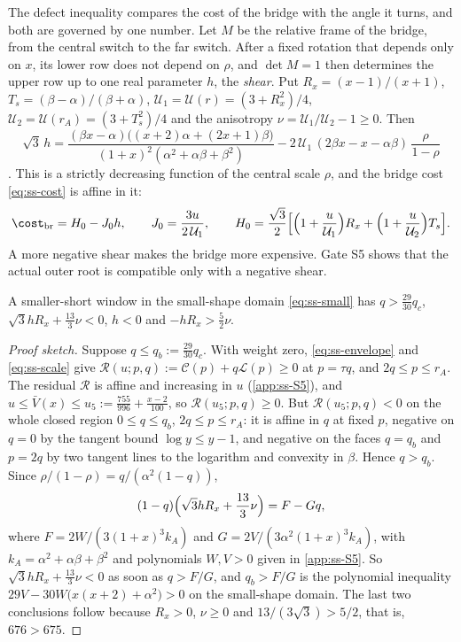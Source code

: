 The defect inequality compares the cost of the bridge with the angle it turns, and both are
governed by one number. Let $M$ be the relative frame of the bridge, from the central switch to
the far switch. After a fixed rotation that depends only on $x$, its lower row does not depend on
$\rho$, and $\det M=1$ then determines the upper row up to one real parameter $h$, the
\emph{shear}. Put $R_x=(x-1)/(x+1)$, $T_s=(\beta-\alpha)/(\beta+\alpha)$,
$\mathcal U_1=\mathcal U(r)=(3+R_x^2)/4$, $\mathcal U_2=\mathcal U(r_A)=(3+T_s^2)/4$ and the
anisotropy $\nu=\mathcal U_1/\mathcal U_2-1\ge0$. Then
\begin{equation}\label{eq:ss-shear}
  \sqrt3\,h=\frac{(\beta x-\alpha)\bigl((x+2)\alpha+(2x+1)\beta\bigr)}
  {(1+x)^2(\alpha^2+\alpha\beta+\beta^2)}
  -2\,\mathcal U_1\,(2\beta x-x-\alpha\beta)\,\frac{\rho}{1-\rho}
\end{equation}. This is a strictly decreasing function of the central scale $\rho$, and the
bridge cost \eqref{eq:ss-cost} is affine in it:
\begin{equation}\label{eq:ss-cost-shear}
  \cost_{\mathrm{br}}=H_0-J_0h,\qquad J_0=\frac{3u}{2\,\mathcal U_1},\qquad
  H_0=\frac{\sqrt3}{2}\Bigl[\Bigl(1+\frac{u}{\mathcal U_1}\Bigr)R_x
   +\Bigl(1+\frac{u}{\mathcal U_2}\Bigr)T_s\Bigr].
\end{equation}
A more negative shear makes the bridge more expensive. Gate S5 shows that the actual outer root is
compatible only with a negative shear.

\begin{proposition}[Gate S5]\label{prop:ss-S5}
A smaller-short window in the small-shape domain \eqref{eq:ss-small} has
$q>\frac{29}{30}q_c$, $\sqrt3hR_x+\frac{13}{3}\nu<0$, $h<0$ and $-hR_x>\frac52\nu$.
\end{proposition}

\begin{proof}[Proof sketch]
Suppose $q\le q_b:=\frac{29}{30}q_c$. With weight zero, \eqref{eq:ss-envelope} and
\eqref{eq:ss-scale} give $\mathcal R(u;p,q):=\mathcal C(p)+q\mathcal L(p)\ge0$ at $p=\tau q$,
and $2q\le p\le r_A$. The residual $\mathcal R$ is affine and increasing in $u$
(\cref{app:ss-S5}), and $u\le\bar V(x)\le u_5:=\frac{755}{996}+\frac{x-2}{100}$, so
$\mathcal R(u_5;p,q)\ge0$. But $\mathcal R(u_5;p,q)<0$ on the whole closed region
$0\le q\le q_b$, $2q\le p\le r_A$: it is affine
in $q$ at fixed $p$, negative on $q=0$ by the tangent bound $\log y\le y-1$, and negative on the
faces $q=q_b$ and $p=2q$ by two tangent lines to the logarithm and convexity in $\beta$. Hence
$q>q_b$. Since $\rho/(1-\rho)=q/(\alpha^2(1-q))$,
\[
  (1-q)\Bigl(\sqrt3hR_x+\frac{13}{3}\nu\Bigr)=F-Gq,
\]
where $F=2W/(3(1+x)^3k_A)$ and $G=2V/(3\alpha^2(1+x)^3k_A)$, with
$k_A=\alpha^2+\alpha\beta+\beta^2$ and polynomials $W,V>0$ given in \cref{app:ss-S5}. So
$\sqrt3hR_x+\frac{13}{3}\nu<0$ as soon as $q>F/G$, and $q_b>F/G$ is the polynomial inequality
$29V-30W\bigl(x(x+2)+\alpha^2\bigr)>0$ on the small-shape domain. The last
two conclusions follow because $R_x>0$, $\nu\ge0$ and $13/(3\sqrt3)>5/2$, that is, $676>675$.
\end{proof}

